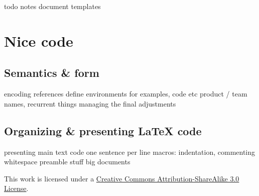 \documentclass[a4paper,twoside,nofonts]{tufte-handout}
\begin{document}
\begin{todoenv}
    todo notes
    document templates
\end{todoenv}



\clearpage
\section{Nice code} %
\label{sec:code}

\subsection{Semantics \& form} %
\label{sec:semantics}

\begin{todoenv}
    encoding
    references
    define environments for examples, code etc
    product / team names, recurrent things
    managing the final adjustments
\end{todoenv}

\subsection{Organizing \& presenting \LaTeX{} code} %
\label{sec:format}

\begin{todoenv}
    presenting main text code
    one sentence per line
    macros: indentation, commenting whitespace
    preamble stuff
    big documents
\end{todoenv}



\clearpage

\nocite{*}


\vfill
\begin{fullwidth}\centering
  \ccbysa\quad
  This work is licensed under a \href{http://creativecommons.org/licenses/by-sa/3.0/}{Creative Commons Attribution-ShareAlike 3.0 License}.
\end{fullwidth}
\clearpage\todos
\end{document}
